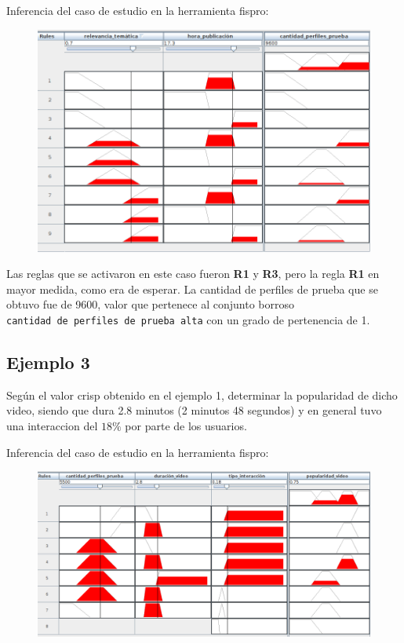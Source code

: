 \documentclass{article}
\begin{document}
Inferencia del caso de estudio en la herramienta fispro:
\begin{figure}[H]
	\centering
	\includegraphics*[scale=0.35]{./Images/p3.png}
\end{figure}

Las reglas que se activaron en este caso fueron \textbf{R1} y \textbf{R3}, pero la regla \textbf{R1} en mayor medida, como era de esperar. La cantidad de perfiles de prueba que se obtuvo fue de 9600, valor que pertenece al conjunto borroso \\ \verb|cantidad de perfiles de prueba alta| con un grado de pertenencia de 1.

\subsection*{Ejemplo 3}

Según el valor crisp obtenido en el ejemplo 1, determinar la popularidad de dicho video, siendo que dura 2.8 minutos (2 minutos 48 segundos) y en general tuvo una interaccion del $18\%$ por parte de los usuarios.

Inferencia del caso de estudio en la herramienta fispro:
\begin{figure}[H]
	\centering
	\includegraphics*[scale=0.32]{./Images/p2.png}
\end{figure}
\end{document}

